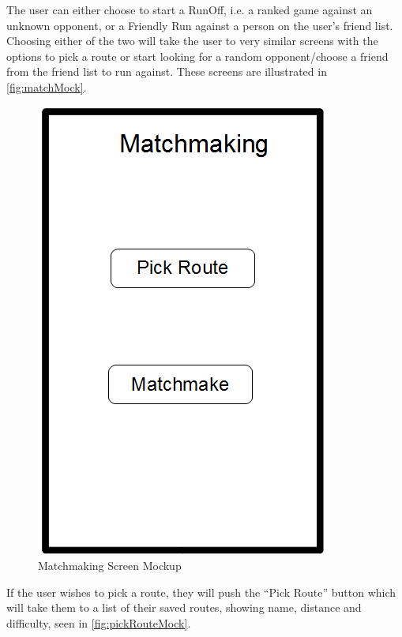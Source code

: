 The user can either choose to start a RunOff, i.e. a ranked game against an unknown opponent, or a Friendly Run against a person on the user's friend list. Choosing either of the two will take the user to very similar screens with the options to pick a route or start looking for a random opponent/choose a friend from the friend list to run against. These screens are illustrated in \autoref{fig:matchMock}.

\begin{figure}[!ht]
	\begin{center}
		\includegraphics[scale=0.4]{img/matchMock.png}
		\caption{Matchmaking Screen Mockup}
		\label{fig:matchMock}
	\end{center}
\end{figure}

If the user wishes to pick a route, they will push the ``Pick Route'' button which will take them to a list of their saved routes, showing name, distance and difficulty, seen in \autoref{fig:pickRouteMock}.

